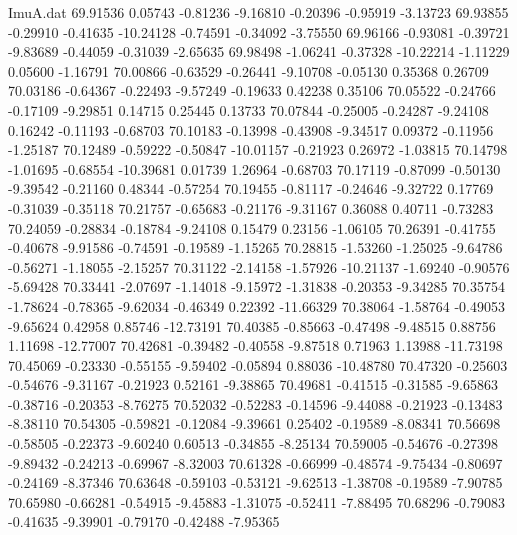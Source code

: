 \begin{filecontents}{ImuA.dat}
  69.91536    0.05743   -0.81236   -9.16810   -0.20396   -0.95919   -3.13723
  69.93855   -0.29910   -0.41635  -10.24128   -0.74591   -0.34092   -3.75550
  69.96166   -0.93081   -0.39721   -9.83689   -0.44059   -0.31039   -2.65635
  69.98498   -1.06241   -0.37328  -10.22214   -1.11229    0.05600   -1.16791
  70.00866   -0.63529   -0.26441   -9.10708   -0.05130    0.35368    0.26709
  70.03186   -0.64367   -0.22493   -9.57249   -0.19633    0.42238    0.35106
  70.05522   -0.24766   -0.17109   -9.29851    0.14715    0.25445    0.13733
  70.07844   -0.25005   -0.24287   -9.24108    0.16242   -0.11193   -0.68703
  70.10183   -0.13998   -0.43908   -9.34517    0.09372   -0.11956   -1.25187
  70.12489   -0.59222   -0.50847  -10.01157   -0.21923    0.26972   -1.03815
  70.14798   -1.01695   -0.68554  -10.39681    0.01739    1.26964   -0.68703
  70.17119   -0.87099   -0.50130   -9.39542   -0.21160    0.48344   -0.57254
  70.19455   -0.81117   -0.24646   -9.32722    0.17769   -0.31039   -0.35118
  70.21757   -0.65683   -0.21176   -9.31167    0.36088    0.40711   -0.73283
  70.24059   -0.28834   -0.18784   -9.24108    0.15479    0.23156   -1.06105
  70.26391   -0.41755   -0.40678   -9.91586   -0.74591   -0.19589   -1.15265
  70.28815   -1.53260   -1.25025   -9.64786   -0.56271   -1.18055   -2.15257
  70.31122   -2.14158   -1.57926  -10.21137   -1.69240   -0.90576   -5.69428
  70.33441   -2.07697   -1.14018   -9.15972   -1.31838   -0.20353   -9.34285
  70.35754   -1.78624   -0.78365   -9.62034   -0.46349    0.22392  -11.66329
  70.38064   -1.58764   -0.49053   -9.65624    0.42958    0.85746  -12.73191
  70.40385   -0.85663   -0.47498   -9.48515    0.88756    1.11698  -12.77007
  70.42681   -0.39482   -0.40558   -9.87518    0.71963    1.13988  -11.73198
  70.45069   -0.23330   -0.55155   -9.59402   -0.05894    0.88036  -10.48780
  70.47320   -0.25603   -0.54676   -9.31167   -0.21923    0.52161   -9.38865
  70.49681   -0.41515   -0.31585   -9.65863   -0.38716   -0.20353   -8.76275
  70.52032   -0.52283   -0.14596   -9.44088   -0.21923   -0.13483   -8.38110
  70.54305   -0.59821   -0.12084   -9.39661    0.25402   -0.19589   -8.08341
  70.56698   -0.58505   -0.22373   -9.60240    0.60513   -0.34855   -8.25134
  70.59005   -0.54676   -0.27398   -9.89432   -0.24213   -0.69967   -8.32003
  70.61328   -0.66999   -0.48574   -9.75434   -0.80697   -0.24169   -8.37346
  70.63648   -0.59103   -0.53121   -9.62513   -1.38708   -0.19589   -7.90785
  70.65980   -0.66281   -0.54915   -9.45883   -1.31075   -0.52411   -7.88495
  70.68296   -0.79083   -0.41635   -9.39901   -0.79170   -0.42488   -7.95365

\end{filecontents}
